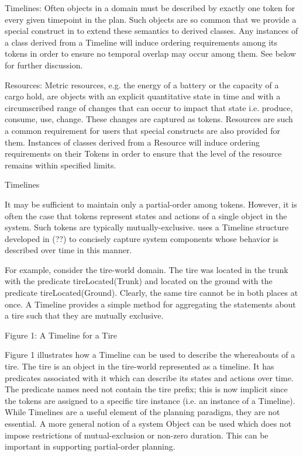 Timelines: Often objects in a domain must be described by exactly one
token for every given timepoint in the plan. Such objects are so
common that we provide a special construct in \eu to extend these
semantics to derived classes. Any instances of a class derived from a
Timeline will induce ordering requirements among its tokens in order
to ensure no temporal overlap may occur among them. See below for
further discussion.

Resources: Metric resources, e.g. the energy of a battery or the
capacity of a cargo hold, are objects with an explicit quantitative
state in time and with a circumscribed range of changes that can occur
to impact that state i.e. produce, consume, use, change. These changes
are captured as tokens. Resources are such a common requirement for
\eu users that special constructs are also provided for
them. Instances of classes derived from a Resource will induce
ordering requirements on their Tokens in order to ensure that the
level of the resource remains within specified limits.

Timelines

It may be sufficient to maintain only a partial-order among
tokens. However, it is often the case that tokens represent states and
actions of a single object in the system. Such tokens are typically
mutually-exclusive. \eu uses a Timeline structure developed in (??)
to concisely capture system components whose behavior is described
over time in this manner.

For example, consider the tire-world domain. The tire was located in
the trunk with the predicate tireLocated(Trunk) and located on the
ground with the predicate tireLocated(Ground). Clearly, the same tire
cannot be in both places at once. A Timeline provides a simple method
for aggregating the statements about a tire such that they are
mutually exclusive.

Figure 1: A Timeline for a Tire

Figure 1 illustrates how a Timeline can be used to describe the
whereabouts of a tire. The tire is an object in the tire-world
represented as a timeline. It has predicates associated with it which
can describe its states and actions over time. The predicate names
need not contain the tire prefix; this is now implicit since the
tokens are assigned to a specific tire instance (i.e. an instance of a
Timeline). While Timelines are a useful element of the \eu planning
paradigm, they are not essential. A more general notion of a system
Object can be used which does not impose restrictions of
mutual-exclusion or non-zero duration. This can be important in
supporting partial-order planning.

